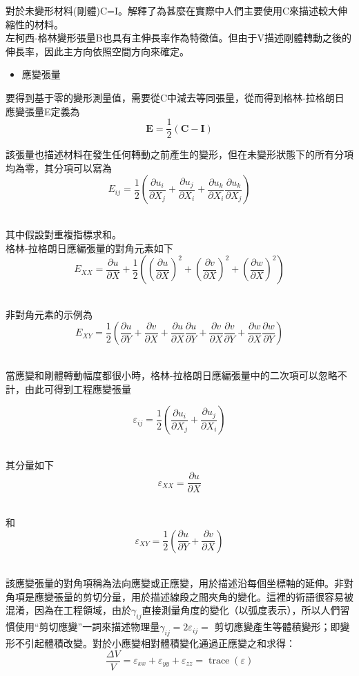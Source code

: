 對於未變形材料(剛體)C=I。解釋了為甚麼在實際中人們主要使用C來描述較大伸縮性的材料。\\

左柯西-格林變形張量B也具有主伸長率作為特徵值。但由于V描述剛體轉動之後的伸長率，因此主方向依照空間方向來確定。\\

\begin{itemize}
\item 應變張量
\end{itemize}

要得到基于零的變形測量值，需要從C中減去等同張量，從而得到格林-拉格朗日應變張量E定義為\
$$\mathbf{E}=\frac{1}{2}(\mathbf{C}-\mathbf{I})$$

該張量也描述材料在發生任何轉動之前產生的變形，但在未變形狀態下的所有分項均為零，其分項可以寫為\
$$E_{i j}=\frac{1}{2}\left(\frac{\partial u_i}{\partial X_j}+\frac{\partial u_j}{\partial X_i}+\frac{\partial u_k}{\partial X_i} \frac{\partial u_k}{\partial X_j}\right)$$\

其中假設對重複指標求和。\\

格林-拉格朗日應編張量的對角元素如下\
$$E_{X X}=\frac{\partial u}{\partial X}+\frac{1}{2}\left(\left(\frac{\partial u}{\partial X}\right)^2+\left(\frac{\partial v}{\partial X}\right)^2+\left(\frac{\partial w}{\partial X}\right)^2\right)$$\

非對角元素的示例為\
$$E_{X Y}=\frac{1}{2}\left(\frac{\partial u}{\partial Y}+\frac{\partial v}{\partial X}+\frac{\partial u}{\partial X} \frac{\partial u}{\partial Y}+\frac{\partial v}{\partial X} \frac{\partial v}{\partial Y}+\frac{\partial w}{\partial X} \frac{\partial w}{\partial Y}\right)$$\

當應變和剛體轉動幅度都很小時，格林-拉格朗日應編張量中的二次項可以忽略不計，由此可得到工程應變張量\

$$\varepsilon_{i j}=\frac{1}{2}\left(\frac{\partial u_i}{\partial X_j}+\frac{\partial u_j}{\partial X_i}\right)$$\

其分量如下\
$$\varepsilon_{X X}=\frac{\partial u}{\partial X}$$\

和\
$$\varepsilon_{X Y}=\frac{1}{2}\left(\frac{\partial u}{\partial Y}+\frac{\partial v}{\partial X}\right)$$\

該應變張量的對角項稱為法向應變或正應變，用於描述沿每個坐標軸的延伸。非對角項是應變張量的剪切分量，用於描述線段之間夾角的變化。這裡的術語很容易被混淆，因為在工程領域，由於$\gamma_{i j}$直接測量角度的變化（以弧度表示），所以人們習慣使用“剪切應變”一詞來描述物理量$\gamma_{i j}=2 \varepsilon_{i j}=$
剪切應變產生等體積變形；即變形不引起體積改變。對於小應變相對體積變化通過正應變之和求得：\
$$\frac{\Delta V}{V}=\varepsilon_{x x}+\varepsilon_{y y}+\varepsilon_{z z}=\operatorname{trace}(\varepsilon)$$

